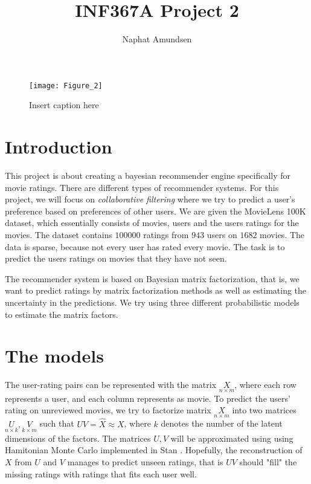 \documentclass[12pt]{article}
\begin{document}
\title{\textbf{INF367A Project 2}}
\author{Naphat Amundsen}
\maketitle
\sectionfont{\fontsize{14}{15}\selectfont}
\subsectionfont{\fontsize{12}{15}\selectfont}
\subsubsectionfont{\fontsize{12}{15}\selectfont}
\graphicspath{ {./images/} }

\ifx
\begin{figure}[H]
	\centering
	\texttt{[image: Figure\_2]}
	\caption{Insert caption here}
\end{figure}
\fi

\newcommand{\opGamma}{\operatorname{Gamma}}
\newcommand{\Um}{\underset{n \times k}{U}}
\newcommand{\Vm}{\underset{k \times m}{V}}
\newcommand{\Xm}{\underset{n \times m}{X}}
\newcommand{\neff}{N_{\text{eff}}}
\newcommand{\rhat}{\hat{R}}

\section*{Introduction}
    This project is about creating a bayesian recommender engine specifically for movie ratings. There are different types of recommender systems. For this project, we will focus on \textit{collaborative filtering} where we try to predict a user's preference based on preferences of other users. We are given the MovieLens 100K dataset, which essentially consists of movies, users and the users ratings for the movies. The dataset contains $100 000$ ratings from $943$ users on $1682$ movies. The data is sparse, because not every user has rated every movie. The task is to predict the users ratings on movies that they have not seen. 

    The recommender system is based on Bayesian matrix factorization, that is, we want to predict ratings by matrix factorization methods as well as estimating the uncertainty in the predictions. We try using three different probabilistic models to estimate the matrix factors.

\section{The models}
    The user-rating pairs can be represented with the matrix $\Xm$, where each row represents a user, and each column represents as movie. To predict the users' rating on unreviewed movies, we try to factorize matrix $\Xm$ into two matrices $\Um, \Vm$ such that $UV = \hat{X} \approx X$, where $k$ denotes the number of the latent dimensions of the factors. The matrices $U,V$ will be approximated using using Hamitonian Monte Carlo implemented in Stan \cite{HMC}. Hopefully, the reconstruction of $X$ from $U$ and $V$ manages to predict unseen ratings, that is $UV$ should "fill" the missing ratings with ratings that fits each user well.
\end{document}
